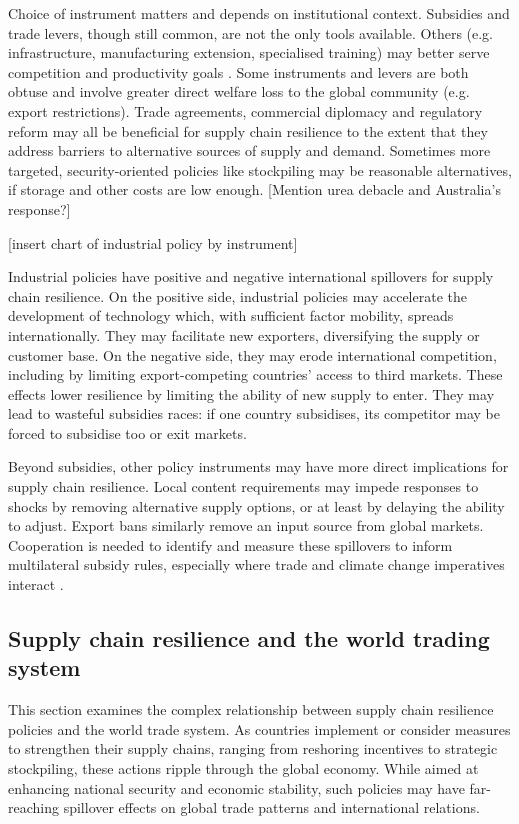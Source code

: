 \documentclass{article}
\begin{document}
Choice of instrument matters and depends on institutional context. Subsidies and trade levers, though still common, are not the only tools available. Others (e.g. infrastructure, manufacturing extension, specialised training) may better serve competition and productivity goals \parencite{juhasz_new_2023}. Some instruments and levers are both obtuse and involve greater direct welfare loss to the global community (e.g. export restrictions). Trade agreements, commercial diplomacy and regulatory reform may all be beneficial for supply chain resilience to the extent that they address barriers to alternative sources of supply and demand. Sometimes more targeted, security-oriented policies like stockpiling may be reasonable alternatives, if storage and other costs are low enough. [Mention urea debacle and Australia's response?]

[insert chart of industrial policy by instrument]

Industrial policies have positive and negative international spillovers for supply chain resilience. On the positive side, industrial policies may accelerate the development of technology which, with sufficient factor mobility, spreads internationally. They may facilitate new exporters, diversifying the supply or customer base. On the negative side, they may erode international competition, including by limiting export-competing countries’ access to third markets. These effects lower resilience by limiting the ability of new supply to enter. They may lead to wasteful subsidies races: if one country subsidises, its competitor may be forced to subsidise too or exit markets.

Beyond subsidies, other policy instruments may have more direct implications for supply chain resilience. Local content requirements may impede responses to shocks by removing alternative supply options, or at least by delaying the ability to adjust. Export bans similarly remove an input source from global markets. Cooperation is needed to identify and measure these spillovers to inform multilateral subsidy rules, especially where trade and climate change imperatives interact \parencite{bown_modern_2024}.

\subsection{Supply chain resilience and the world trading system}

This section examines the complex relationship between supply chain resilience policies and the world trade system. As countries implement or consider measures to strengthen their supply chains, ranging from reshoring incentives to strategic stockpiling, these actions ripple through the global economy. While aimed at enhancing national security and economic stability, such policies may have far-reaching spillover effects on global trade patterns and international relations.
\end{document}
